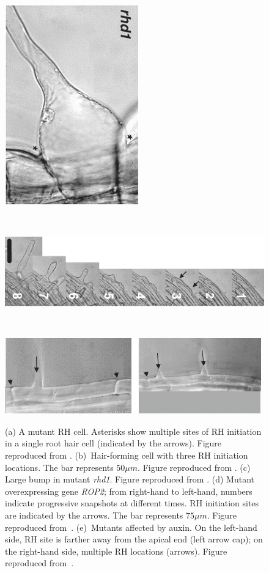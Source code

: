\begin{figure}[t!]
\hspace{1.3cm}
\begin{minipage}{3.3cm}
    \centering
    \includegraphics[height=0.27\textheight]{fig01/rhd1}\label{sf:multiRH02c}
\end{minipage}
\\ \vspace{0.1cm}
\begin{minipage}{10cm}
    \centering
    \includegraphics[height=0.145\textheight]{fig01/mutantrhd6}\label{sf:multiRH02d}
\end{minipage}
\\ \vspace{0.1cm}
\begin{minipage}{10cm}
    \centering
    \includegraphics[height=0.16\textheight]{fig01/auxab}\label{sf:multiRH02e}
\end{minipage}
\caption{(a) A mutant RH cell. Asterisks show multiple sites of RH initiation in a single root hair cell (indicated by the arrows). Figure reproduced from \cite{rigas01}. (b)~Hair-forming cell with three RH initiation locations. The bar represents $50\mu m$. Figure reproduced from \cite{massuci01}. (c) Large bump in mutant {\itshape rhd1}. Figure reproduced from \cite{griersonRH}. (d) Mutant overexpressing gene {\itshape ROP2}; from right-hand to left-hand, numbers indicate progressive snapshots at different times. RH initiation sites are indicated by the arrows. The bar represents $75\mu m$. Figure reproduced from~\cite{mjones01}. (e)~Mutants affected by auxin. On the left-hand side, RH site is farther away from the apical end (left arrow cap); on the right-hand side, multiple RH locations (arrows). Figure reproduced from~\cite{payne01}.}

\end{figure}
